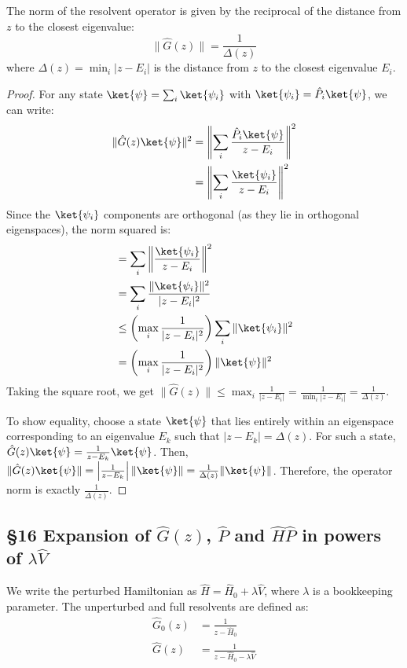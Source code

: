 \begin{theorem}
    The norm of the resolvent operator is given by the reciprocal of
    the distance from $z$ to the closest eigenvalue:
    \begin{equation} \label{eq:resolvent_norm}
        \|\hat G(z)\|=\frac{1}{\Delta(z)}
    \end{equation}
    where $\Delta(z) = \min_i |z-E_i|$ is the distance from $z$ to
    the closest eigenvalue $E_i$.
\end{theorem}
\begin{proof}
    For any state $\ket{\psi} = \sum_i \ket{\psi_i}$ with
    $\ket{\psi_i}=\hat P_i\ket{\psi}$, we can write:
    \begin{align}
        \|\hat G(z)\ket{\psi}\|^2 &= \left\|\sum_i \frac{\hat P_i
        \ket{\psi}}{z-E_i}\right\|^2 \\
        &= \left\|\sum_i \frac{\ket{\psi_i}}{z-E_i}\right\|^2 \notag
    \end{align}
    Since the $\ket{\psi_i}$ components are orthogonal (as they lie
    in orthogonal eigenspaces), the norm squared is:
    \begin{align}
        &= \sum_i \left\|\frac{\ket{\psi_i}}{z-E_i}\right\|^2 \notag \\
        &= \sum_i \frac{\|\ket{\psi_i}\|^2}{|z-E_i|^2} \notag \\
        &\le \left(\max_i \frac{1}{|z-E_i|^2}\right) \sum_i
        \|\ket{\psi_i}\|^2 \notag \\
        &= \left(\max_i \frac{1}{|z-E_i|^2}\right)\|\ket{\psi}\|^2 \notag
    \end{align}
    Taking the square root, we get $\|\hat G(z)\|\le \max_i
    \frac{1}{|z-E_i|} = \frac{1}{\min_i |z-E_i|} = \frac{1}{\Delta(z)}$.

    To show equality, choose a state $\ket{\psi}$ that lies entirely
    within an eigenspace corresponding to an eigenvalue $E_k$ such
    that $|z-E_k| = \Delta(z)$. For such a state, $\hat
    G(z)\ket{\psi} = \frac{1}{z-E_k}\ket{\psi}$.
    Then, $\|\hat G(z)\ket{\psi}\| = \left|\frac{1}{z-E_k}\right|
    \|\ket{\psi}\| = \frac{1}{\Delta(z)} \|\ket{\psi}\|$.
    Therefore, the operator norm is exactly $\frac{1}{\Delta(z)}$.
\end{proof}

\hr
\subsection{§16 Expansion of $\hat G(z)$, $\hat P$ and $\hat H \hat
P$ in powers of $\lambda \hat V$}
\begin{definition}
    We write the perturbed Hamiltonian as $\hat H=\hat H_0+\lambda
    \hat V$, where $\lambda$ is a bookkeeping parameter. The
    unperturbed and full resolvents are defined as:
    \begin{align} \label{eq:unperturbed_resolvent}
        \hat G_0(z) &=\frac{1}{z-\hat H_0} \\
        \hat G(z) &=\frac{1}{z-\hat H_0-\lambda \hat V}
    \end{align}
\end{definition}


